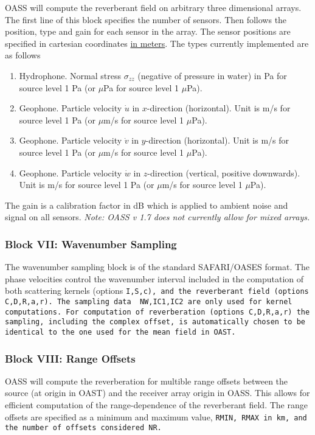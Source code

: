 OASS will compute the reverberant field on arbitrary
three dimensional arrays. The first line of this block specifies the
number of sensors. Then follows the position, type and gain for each
sensor in the array. The  sensor positions are specified in
cartesian coordinates \underline{in meters}. The types currently
implemented are as follows

\begin{enumerate}
\item Hydrophone. Normal stress $ \sigma_{zz}$ (negative of pressure in
water) in Pa for source level 1 Pa (or $\mu$Pa for source level 1 $\mu$Pa). 
\item Geophone. Particle velocity $\dot{u}$ in $x$-direction
(horizontal).  Unit is
m/s for source level 1 Pa (or $\mu$m/s for source level 1 $\mu$Pa).
\item Geophone. Particle velocity $\dot{v}$ in $y$-direction
(horizontal).  Unit is
m/s for source level 1 Pa (or $\mu$m/s for source level 1 $\mu$Pa).
\item Geophone. Particle velocity $\dot{w}$ in $z$-direction
(vertical, positive downwards).  Unit is
m/s for source level 1 Pa (or $\mu$m/s for source level 1 $\mu$Pa).
\end{enumerate}

The gain is a calibration factor in dB which is applied to
ambient noise and signal on all sensors. {\em Note: OASS v 1.7 does
not currently allow for mixed arrays.}

\subsubsection{Block VII: Wavenumber Sampling}

The wavenumber sampling block is of the standard SAFARI/OASES format.
The phase velocities control the wavenumber interval included in the
computation of both scattering kernels (options \tt I,S,c\rm), and the
reverberant field (options \tt C,D,R,a,r\rm). The sampling data \tt
NW,IC1,IC2 \rm are only used for kernel computations. For computation
of reverberation (options \tt C,D,R,a,r\rm) the sampling, including the
complex offset, is
automatically chosen to be identical to the one used for the mean
field in OAST.

\subsubsection{Block VIII: Range Offsets}

OASS will compute the reverberation for multible range offsets  between the
source (at origin in OAST) and the receiver array origin in OASS. This
allows for efficient computation of the range-dependence of the
reverberant field. The range offsets are specified as a minimum and
maximum value, \tt RMIN, RMAX \rm in km, and the number of offsets
considered \tt NR. \rm 

